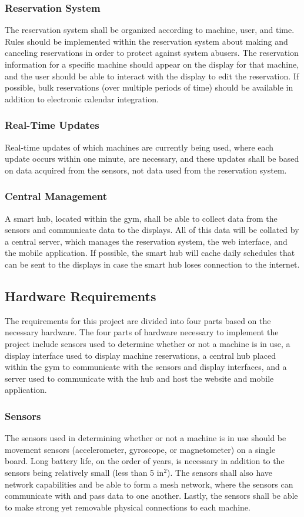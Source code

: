 \documentclass[PPFS.tex]{template/subfiles}
\begin{document}
\subsubsection{Reservation System}
The reservation system shall be organized according to machine, user, and time. Rules should be implemented within the reservation system about making and canceling reservations in order to protect against system abusers. The reservation information for a specific machine should appear on the display for that machine, and the user should be able to interact with the display to edit the reservation. If possible, bulk reservations (over multiple periods of time) should be available in addition to electronic calendar integration.

\subsubsection{Real-Time Updates}
Real-time updates of which machines are currently being used, where each update occurs within one minute, are necessary, and these updates shall be based on data acquired from the sensors, not data used from the reservation system.

\subsubsection{Central Management}
A smart hub, located within the gym, shall be able to collect data from the sensors and communicate data to the displays. All of this data will be collated by a central server, which manages the reservation system, the web interface, and the mobile application. If possible, the smart hub will cache daily schedules that can be sent to the displays in case the smart hub loses connection to the internet.

\subsection{Hardware Requirements}
The requirements for this project are divided into four parts based on the necessary hardware. The four parts of hardware necessary to implement the project include sensors used to determine whether or not a machine is in use, a display interface used to display machine reservations, a central hub placed within the gym to communicate with the sensors and display interfaces, and a server used to communicate with the hub and host the website and mobile application.

\subsubsection{Sensors}
The sensors used in determining whether or not a machine is in use should be movement sensors (accelerometer, gyroscope, or magnetometer) on a single board. Long battery life, on the order of years, is necessary in addition to the sensors being relatively small (less than 5 in$^2$). The sensors shall also have network capabilities and be able to form a mesh network, where the sensors can communicate with and pass data to one another. Lastly, the sensors shall be able to make strong yet removable physical connections to each machine.
\end{document}
